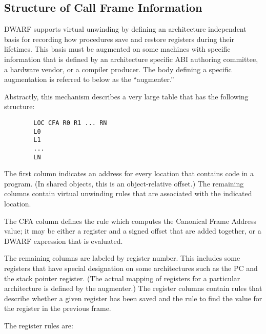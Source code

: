 \subsection{Structure of Call Frame Information}
\label{chap:structureofcallframeinformation}

DWARF supports virtual unwinding by defining an architecture
independent basis for recording how procedures save and restore
registers during their lifetimes. This basis must be augmented
on some machines with specific information that is defined by
an architecture specific ABI authoring committee, a hardware
vendor, or a compiler producer. The body defining a specific
augmentation is referred to below as the ``augmenter.''

Abstractly, this mechanism describes a very large table that
has the following structure:

\begin{verbatim}
        LOC CFA R0 R1 ... RN
        L0
        L1
        ...
        LN
\end{verbatim}


The first column indicates an address for every location
that contains code in a program. (In shared objects, this
is an object-relative offset.) The remaining columns contain
virtual unwinding rules that are associated with the indicated
location.

The CFA column defines the rule which computes the Canonical
Frame Address value; it may be either a register and a signed
offset that are added together, or a DWARF expression that
is evaluated.

The remaining columns are labeled by register number. This
includes some registers that have special designation on
some architectures such as the PC and the stack pointer
register. (The actual mapping of registers for a particular
architecture is defined by the augmenter.) The register columns
contain rules that describe whether a given register has been
saved and the rule to find the value for the register in the
previous frame.

The register rules are:

